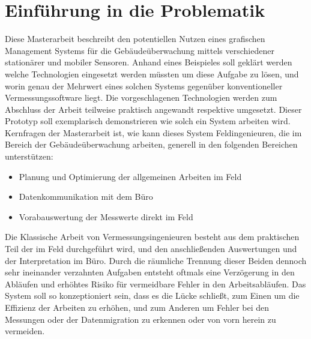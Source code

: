 \chapter{Einführung in die Problematik}
Diese Masterarbeit beschreibt den potentiellen Nutzen eines grafischen Management Systems für die Gebäudeüberwachung mittels verschiedener stationärer und mobiler Sensoren. Anhand eines Beispieles soll geklärt werden welche Technologien eingesetzt werden müssten um diese Aufgabe zu lösen, und worin genau der Mehrwert eines solchen Systems gegenüber konventioneller Vermessungssoftware liegt. Die vorgeschlagenen Technologien werden zum Abschluss der Arbeit teilweise praktisch angewandt respektive umgesetzt. Dieser Prototyp soll exemplarisch demonstrieren wie solch ein System arbeiten wird. Kernfragen der Masterarbeit ist, wie kann dieses System Feldingenieuren, die im Bereich der Gebäudeüberwachung arbeiten, generell in den folgenden Bereichen unterstützen:
\begin{itemize}
\item Planung und Optimierung der allgemeinen Arbeiten im Feld
\item Datenkommunikation mit dem Büro
\item Vorabauswertung der Messwerte direkt im Feld
\end{itemize}
Die Klassische Arbeit von Vermessungsingenieuren besteht aus dem praktischen Teil der im Feld durchgeführt wird, und den anschließenden Auswertungen und der Interpretation im Büro. Durch die räumliche Trennung dieser Beiden dennoch sehr ineinander verzahnten Aufgaben entsteht oftmals eine Verzögerung in den Abläufen und erhöhtes Risiko für vermeidbare Fehler in den Arbeitsabläufen. Das System soll so konzeptioniert sein, dass es die Lücke schließt, zum Einen um die Effizienz der Arbeiten zu erhöhen, und zum Anderen um Fehler bei den Messungen oder der Datenmigration zu erkennen oder von vorn herein zu vermeiden. 

